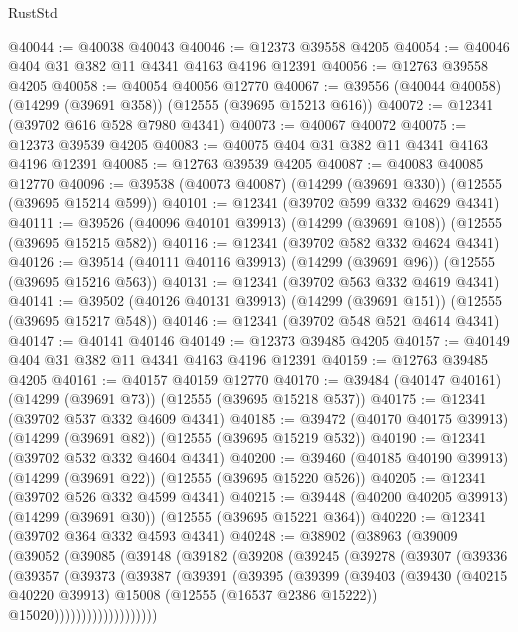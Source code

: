 \begin{lexlean}{RustStd}
\begin{coremodule}
@40044 := @40038 @40043
@40046 := @12373 @39558 @4205
@40054 := @40046 @404 @31 @382 @11 @4341 @4163 @4196 @12391
@40056 := @12763 @39558 @4205
@40058 := @40054 @40056 @12770
@40067 := @39556 (@40044 @40058) (@14299 (@39691 @358)) (@12555 (@39695 @15213 @616))
@40072 := @12341 (@39702 @616 @528 @7980 @4341)
@40073 := @40067 @40072
@40075 := @12373 @39539 @4205
@40083 := @40075 @404 @31 @382 @11 @4341 @4163 @4196 @12391
@40085 := @12763 @39539 @4205
@40087 := @40083 @40085 @12770
@40096 := @39538 (@40073 @40087) (@14299 (@39691 @330)) (@12555 (@39695 @15214 @599))
@40101 := @12341 (@39702 @599 @332 @4629 @4341)
@40111 := @39526 (@40096 @40101 @39913) (@14299 (@39691 @108)) (@12555 (@39695 @15215 @582))
@40116 := @12341 (@39702 @582 @332 @4624 @4341)
@40126 := @39514 (@40111 @40116 @39913) (@14299 (@39691 @96)) (@12555 (@39695 @15216 @563))
@40131 := @12341 (@39702 @563 @332 @4619 @4341)
@40141 := @39502 (@40126 @40131 @39913) (@14299 (@39691 @151)) (@12555 (@39695 @15217 @548))
@40146 := @12341 (@39702 @548 @521 @4614 @4341)
@40147 := @40141 @40146
@40149 := @12373 @39485 @4205
@40157 := @40149 @404 @31 @382 @11 @4341 @4163 @4196 @12391
@40159 := @12763 @39485 @4205
@40161 := @40157 @40159 @12770
@40170 := @39484 (@40147 @40161) (@14299 (@39691 @73)) (@12555 (@39695 @15218 @537))
@40175 := @12341 (@39702 @537 @332 @4609 @4341)
@40185 := @39472 (@40170 @40175 @39913) (@14299 (@39691 @82)) (@12555 (@39695 @15219 @532))
@40190 := @12341 (@39702 @532 @332 @4604 @4341)
@40200 := @39460 (@40185 @40190 @39913) (@14299 (@39691 @22)) (@12555 (@39695 @15220 @526))
@40205 := @12341 (@39702 @526 @332 @4599 @4341)
@40215 := @39448 (@40200 @40205 @39913) (@14299 (@39691 @30)) (@12555 (@39695 @15221 @364))
@40220 := @12341 (@39702 @364 @332 @4593 @4341)
@40248 := @38902
    (@38963
      (@39009
        (@39052
          (@39085
            (@39148
              (@39182
                (@39208
                  (@39245
                    (@39278
                      (@39307
                        (@39336
                          (@39357
                            (@39373
                              (@39387
                                (@39391
                                  (@39395
                                    (@39399
                                      (@39403
                                        (@39430
                                          (@40215 @40220 @39913)
                                          @15008
                                          (@12555 (@16537 @2386 @15222))
                                          @15020)))))))))))))))))))

\end{coremodule}
\end{lexlean}
